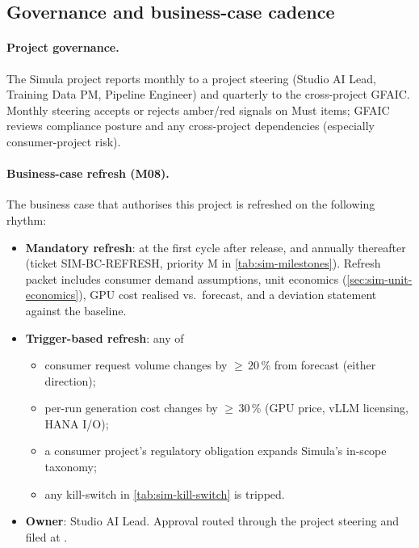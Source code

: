 \subsection{Governance and business-case cadence}\label{sec:sim-governance}

\paragraph{Project governance.}
The Simula project reports monthly to a project steering (Studio AI
Lead, Training Data PM, Pipeline Engineer) and quarterly to the
cross-project GFAIC. Monthly steering accepts or rejects amber/red
signals on Must items; GFAIC reviews compliance posture and any
cross-project dependencies (especially consumer-project risk).

\paragraph{Business-case refresh (M08).}
The business case that authorises this project is refreshed on the
following rhythm:

\begin{itemize}
  \item \textbf{Mandatory refresh}: at the first cycle after release,
        and annually thereafter (ticket SIM-BC-REFRESH, priority M in
        \cref{tab:sim-milestones}). Refresh packet includes consumer
        demand assumptions, unit economics (\cref{sec:sim-unit-economics}),
        GPU cost realised vs.\ forecast, and a deviation statement
        against the baseline.
  \item \textbf{Trigger-based refresh}: any of
        \begin{itemize}
          \item consumer request volume changes by $\ge\,20$\,\% from
                forecast (either direction);
          \item per-run generation cost changes by $\ge\,30$\,\% (GPU
                price, vLLM licensing, HANA I/O);
          \item a consumer project's regulatory obligation expands
                Simula's in-scope taxonomy;
          \item any kill-switch in \cref{tab:sim-kill-switch} is
                tripped.
        \end{itemize}
  \item \textbf{Owner}: Studio AI Lead. Approval routed through the
        project steering and filed at
        .
\end{itemize}

